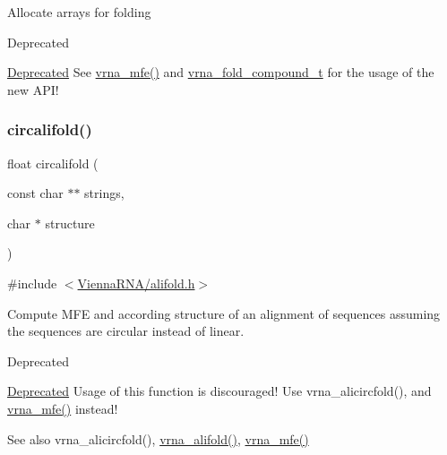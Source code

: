Allocate arrays for folding~\newline
\begin{DoxyRefDesc}{Deprecated}
\item[\hyperlink{deprecated__deprecated000078}{Deprecated}]See \hyperlink{group__mfe__global_gabd3b147371ccf25c577f88bbbaf159fd}{vrna\+\_\+mfe()} and \hyperlink{group__fold__compound_ga1b0cef17fd40466cef5968eaeeff6166}{vrna\+\_\+fold\+\_\+compound\+\_\+t} for the usage of the new A\+P\+I!\end{DoxyRefDesc}
\mbox{\label{group__mfe__global__deprecated_gadbd3b0b1c144cbfb4efe704b2b260f96}} 
\subsubsection{\texorpdfstring{circalifold()}{circalifold()}}
{\footnotesize\ttfamily float circalifold (\begin{DoxyParamCaption}\item[{const char $\ast$$\ast$}]{strings,  }\item[{char $\ast$}]{structure }\end{DoxyParamCaption})}



{\ttfamily \#include $<$\hyperlink{alifold_8h}{Vienna\+R\+N\+A/alifold.\+h}$>$}



Compute M\+FE and according structure of an alignment of sequences assuming the sequences are circular instead of linear. 

\begin{DoxyRefDesc}{Deprecated}
\item[\hyperlink{deprecated__deprecated000013}{Deprecated}]Usage of this function is discouraged! Use vrna\+\_\+alicircfold(), and \hyperlink{group__mfe__global_gabd3b147371ccf25c577f88bbbaf159fd}{vrna\+\_\+mfe()} instead! \end{DoxyRefDesc}
\begin{DoxySeeAlso}{See also}
vrna\+\_\+alicircfold(), \hyperlink{group__mfe__global_ga6c9d3bef3e92c6d423ffac9f981418c1}{vrna\+\_\+alifold()}, \hyperlink{group__mfe__global_gabd3b147371ccf25c577f88bbbaf159fd}{vrna\+\_\+mfe()}
\end{DoxySeeAlso}

